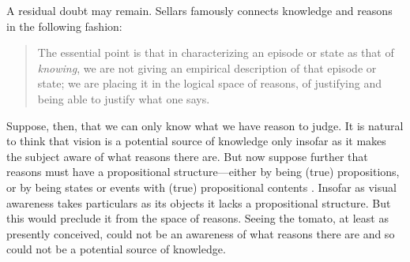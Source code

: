 \documentclass[12pt]{article}
\begin{document}

A residual doubt may remain. Sellars famously connects knowledge and reasons in the following fashion:
\begin{quote}
	The essential point is that in characterizing an episode or state as that of \emph{knowing}, we are not giving an empirical description of that episode or state; we are placing it in the logical space of reasons, of justifying and being able to justify what one says. \citep[§36]{Sellars:1956xp}
\end{quote}
Suppose, then, that we can only know what we have reason to judge. It is natural to think that vision is a potential source of knowledge only insofar as it makes the subject aware of what reasons there are. But now suppose further that reasons must have a propositional structure---either by being (true) propositions, or by being states or events with (true) propositional contents \citep[see][141, 143--4]{McDowell:1996uq}. Insofar as visual awareness takes particulars as its objects it lacks a propositional structure. But this would preclude it from the space of reasons. Seeing the tomato, at least as presently conceived, could not be an awareness of what reasons there are and so could not be a potential source of knowledge.
\end{document}
